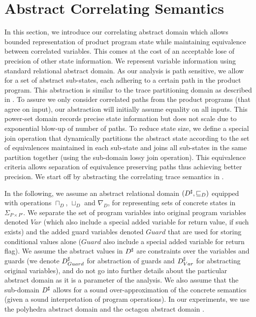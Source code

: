 \section{Abstract Correlating Semantics}

In this section, we introduce our correlating abstract domain which allows bounded representation of product program state while maintaining equivalence between correlated variables. This comes at the cost of an acceptable lose of precision of other state information. We represent variable information using standard relational abstract domain. As our analysis is path sensitive, we allow for a set of abstract sub-states, each adhering to a certain path in the product program. This abstraction is similar to the trace partitioning domain as described in \cite{MauborgneRival07}. To assure we only consider correlated paths from the product programs (that agree on input), our abstraction will initially assume equality on all inputs. This power-set domain records precise state information but does not scale due to exponential blow-up of number of paths. To reduce state size, we define a special join operation that dynamically partitions the abstract state according to the set of equivalences maintained in each sub-state and joins all sub-states in the same partition together (using the sub-domain lossy join operation). This equivalence criteria allows separation of equivalence preserving paths thus achieving better precision. We start off by abstracting the correlating trace semantics in .

In the following, we assume an abstract relational domain $(D^\sharp, \sqsubseteq_{D})$ equipped with operations $\sqcap_{D}$, $\sqcup_{D}$ and $\nabla_{D}$, for representing sets of concrete states in $\Sigma_{P \times P'}$. We separate the set of program variables into original program variables denoted $Var$ (which also include a special added variable for return value, if such exists) and the added guard variables denoted $Guard$ that are used for storing conditional values alone ($Guard$ also include a special added variable for return flag). We assume the abstract values in $D^\sharp$ are constraints over the variables and guards (we denote $D^\sharp_{Guard}$ for abstraction of guards and $D^\sharp_{Var}$ for abstracting original variables), and do not go into further details about the particular abstract domain as it is a parameter of the analysis. We also assume that the sub-domain $D^\sharp$ allows for a sound over-approximation of the concrete semantics (given a sound interpretation of program operations). In our experiments, we use the polyhedra abstract domain \cite{} and the octagon abstract domain \cite{Mine07}.

